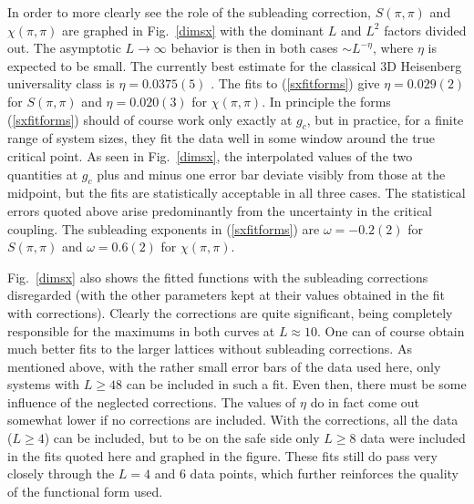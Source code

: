 \documentclass[draft,numberedheadings]{aipproc}
\begin{document}
In order to more clearly see the role of the subleading correction, $S(\pi,\pi)$ and $\chi(\pi,\pi)$ are graphed in Fig.~\ref{dimsx} with the dominant $L$ 
and $L^2$ factors divided out. The asymptotic $L \to \infty$ behavior is then in both cases $\sim L^{-\eta}$, where $\eta$ is expected to be small. The 
currently best estimate for the classical 3D Heisenberg universality class is $\eta=0.0375(5)$ \cite{series}. The fits to (\ref{sxfitforms}) give 
$\eta=0.029(2)$ for $S(\pi,\pi)$  and $\eta=0.020(3)$ for $\chi(\pi,\pi)$. In principle the forms (\ref{sxfitforms}) should of course work only exactly at 
$g_c$, but in practice, for a finite range of system sizes, they fit the data well in some window around the true critical point. As seen in Fig.~\ref{dimsx}, 
the interpolated values of the two quantities at $g_c$ plus and minus one error bar deviate visibly from those at the midpoint, but the fits are statistically
acceptable in all three cases. The statistical errors quoted above arise predominantly from the uncertainty in the critical coupling. The subleading 
exponents in (\ref{sxfitforms}) are $\omega=-0.2(2)$ for $S(\pi,\pi)$  and $\omega=0.6(2)$ for $\chi(\pi,\pi)$.

Fig.~\ref{dimsx} also shows the fitted functions with the subleading corrections disregarded (with the other parameters kept at their values obtained
in the fit with corrections). Clearly the corrections are quite significant, being completely responsible for the maximums in both curves at $L\approx 10$. 
One can of course obtain much better fits to the larger lattices without subleading corrections. As mentioned above, with the rather small error bars 
of the data used here, only systems with $L\ge 48$ can be included in such a fit. Even then, there must be some influence of the neglected corrections. The 
values of $\eta$ do in fact come out somewhat lower if no corrections are included. With the corrections, all the data ($L\ge 4$) can be included, but to 
be on the safe side only $L\ge 8$ data were included in the fits quoted here and graphed in the figure. These fits still do pass very closely through the 
$L=4$ and $6$ data points, which further reinforces the quality of the functional form used.
\end{document}
